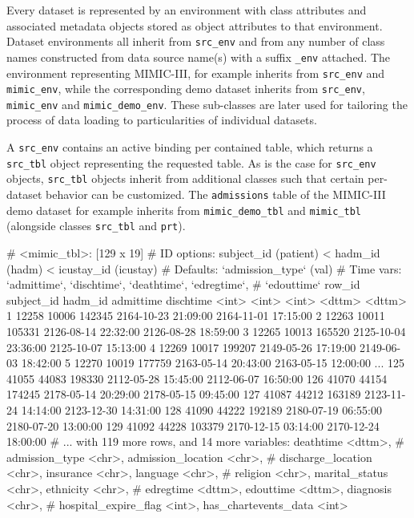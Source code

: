 \documentclass[
  notitle]{jss}
\begin{document}
Every dataset is represented by an environment with class attributes and
associated metadata objects stored as object attributes to that
environment. Dataset environments all inherit from \texttt{src\_env} and
from any number of class names constructed from data source name(s) with
a suffix \texttt{\_env} attached. The environment representing
MIMIC-III, for example inherits from \texttt{src\_env} and
\texttt{mimic\_env}, while the corresponding demo dataset inherits from
\texttt{src\_env}, \texttt{mimic\_env} and \texttt{mimic\_demo\_env}.
These sub-classes are later used for tailoring the process of data
loading to particularities of individual datasets.

A \texttt{src\_env} contains an active binding per contained table,
which returns a \texttt{src\_tbl} object representing the requested
table. As is the case for \texttt{src\_env} objects, \texttt{src\_tbl}
objects inherit from additional classes such that certain per-dataset
behavior can be customized. The \texttt{admissions} table of the
MIMIC-III demo dataset for example inherits from
\texttt{mimic\_demo\_tbl} and \texttt{mimic\_tbl} (alongside classes
\texttt{src\_tbl} and \texttt{prt}).

\begin{CodeChunk}
\begin{CodeOutput}
# <mimic_tbl>: [129 x 19]
# ID options:  subject_id (patient) < hadm_id (hadm) < icustay_id (icustay)
# Defaults:    `admission_type` (val)
# Time vars:   `admittime`, `dischtime`, `deathtime`, `edregtime`,
#   `edouttime`
    row_id subject_id hadm_id admittime           dischtime
     <int>      <int>   <int> <dttm>              <dttm>
  1  12258      10006  142345 2164-10-23 21:09:00 2164-11-01 17:15:00
  2  12263      10011  105331 2126-08-14 22:32:00 2126-08-28 18:59:00
  3  12265      10013  165520 2125-10-04 23:36:00 2125-10-07 15:13:00
  4  12269      10017  199207 2149-05-26 17:19:00 2149-06-03 18:42:00
  5  12270      10019  177759 2163-05-14 20:43:00 2163-05-15 12:00:00
...
125  41055      44083  198330 2112-05-28 15:45:00 2112-06-07 16:50:00
126  41070      44154  174245 2178-05-14 20:29:00 2178-05-15 09:45:00
127  41087      44212  163189 2123-11-24 14:14:00 2123-12-30 14:31:00
128  41090      44222  192189 2180-07-19 06:55:00 2180-07-20 13:00:00
129  41092      44228  103379 2170-12-15 03:14:00 2170-12-24 18:00:00
# ... with 119 more rows, and 14 more variables: deathtime <dttm>,
#   admission_type <chr>, admission_location <chr>,
#   discharge_location <chr>, insurance <chr>, language <chr>,
#   religion <chr>, marital_status <chr>, ethnicity <chr>,
#   edregtime <dttm>, edouttime <dttm>, diagnosis <chr>,
#   hospital_expire_flag <int>, has_chartevents_data <int>
\end{CodeOutput}
\end{CodeChunk}
\end{document}
